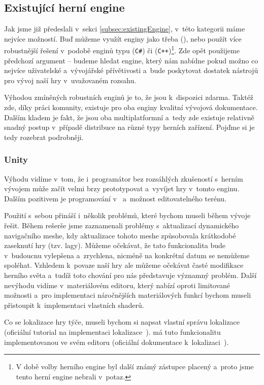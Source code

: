 \subsection{Existující herní engine}
Jak jsme již předeslali v~sekci \ref{subsec:existingEngine}, v~této kategorii máme nejvíce možností. Buď můžeme využít enginy jako třeba \OG{} (\CPP{}), nebo použít více robustnější řešení v~podobě enginů typu \UN{} (\texttt{C\#}) či \UE{} (\texttt{C++})\footnote{V době volby herního engine byl další známý zástupce \CRY{} placený a~proto jsme tento herní engine nebrali v~potaz.}. Zde opět použijeme předchozí argument -- budeme hledat engine, který nám nabídne pokud možno co nejvíce uživatelské a~vývojářské přívětivosti a~bude poskytovat dostatek nástrojů pro vývoj naší hry v~uvažovaném rozsahu.

Výhodou zmíněných robustních enginů je to, že jsou k~dispozici zdarma. Taktéž zde, díky práci komunity, existuje pro oba enginy kvalitní vývojová dokumentace. Dalším kladem je fakt, že jsou oba multiplatformní a~tedy zde existuje relativně snadný postup v~případě distribuce na různé typy herních zařízení. Pojďme si je tedy rozebrat podrobněji.

\subsubsection{Unity}
Výhodu \UN{} vidíme v~tom, že i~programátor bez rozsáhlých zkušeností s~herním vývojem může začít velmi brzy prototypovat a~vyvíjet hry v~tomto enginu. Dalším pozitivem je programování v~\CS{} a~možnost editovatelného terénu.

Použití \UN{} s~sebou přináší i~několik problémů, které bychom museli během vývoje řešit. Během rešerše jsme zaznamenali problémy s~aktualizací dynamického navigačního meshe, kdy aktualizace tohoto meshe způsobovala krátkodobé zaseknutí hry (tzv. lagy). Můžeme očekávat, že tato funkcionalita bude v~budoucnu vylepšena a~zrychlena, nicméně na konkrétní datum se nemůžeme spoléhat. Vzhledem k~povaze naší hry ale můžeme očekávat časté modifikace herního světa a~tudíž toto chování pro nás představuje významný problém. Další nevýhodu vidíme v~materiálovém editoru, který nabízí oproti \UE{} limitované možnosti a~pro implementaci náročnějších materiálových funkcí bychom museli přistoupit k~implementaci vlastních shaderů.

Co se lokalizace hry týče, museli bychom si napsat vlastní správu lokalizace (oficiální tutorial na implementaci lokalizace~\citep{unity_loc}). \UE{} má tuto funkcionalitu implementovanou ve svém editoru (oficiální dokumentace k~lokalizaci~\citep{ue_loc}).


